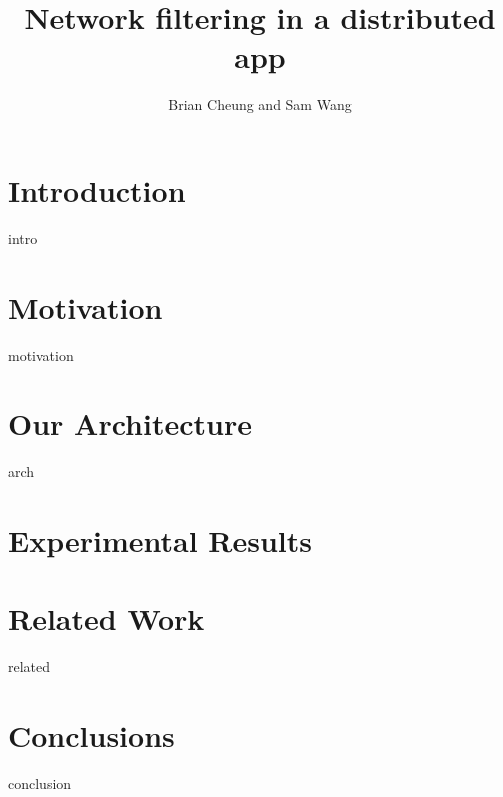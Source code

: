 \documentclass{sig-alternate}
\newcommand{\ignore}[1]{}
\begin{document}
\title{ Network filtering in a distributed app}
\author{Brian Cheung and Sam Wang}

\date{}  %

\maketitle

\begin{abstract}
 
\end{abstract}

\section{Introduction}
\label{sec:intro}
 {intro}

\section{Motivation}
\label{sec:motivation}
 {motivation}

\ignore{Sometimes background is merged into motivation, and is not required separately.}

\section{Our Architecture}
\label{sec:arch}
 {arch}

\section{Experimental Results}
\label{sec:results}


\section{Related Work}
\label{sec:related}
 {related}

\section{Conclusions}
\label{sec:conclusion}
 {conclusion}


{ 


}
\end{document}
